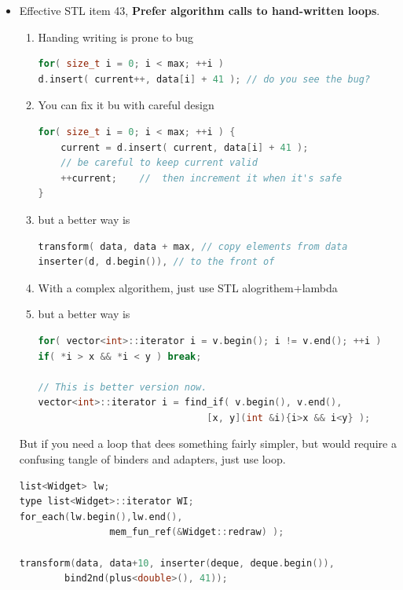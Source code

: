 \documentclass[a4paper,11pt,twoside]{book}
\begin{document}
\begin{itemize}

\item Effective STL item 43, \textbf{Prefer algorithm calls to hand-written loops}.
\begin{enumerate}
\item  Handing writing is prone to bug

\begin{lstlisting}[frame=single, language=c++]
for( size_t i = 0; i < max; ++i )
d.insert( current++, data[i] + 41 ); // do you see the bug?
\end{lstlisting}
\item You can fix it bu with careful design
\begin{lstlisting}[frame=single, language=c++]
for( size_t i = 0; i < max; ++i ) {
	current = d.insert( current, data[i] + 41 ); 
	// be careful to keep current valid
	++current;    //  then increment it when it's safe
}
\end{lstlisting}
\item but a better way is
\begin{lstlisting}[frame=single, language=c++]
transform( data, data + max, // copy elements from data
inserter(d, d.begin()), // to the front of
\end{lstlisting}

\item With a complex algorithem, just use STL alogrithem+lambda
\item but a better way is
\begin{lstlisting}[frame=single, language=c++]
for( vector<int>::iterator i = v.begin(); i != v.end(); ++i )
if( *i > x && *i < y ) break;

// This is better version now.
vector<int>::iterator i = find_if( v.begin(), v.end(),
                              [x, y](int &i){i>x && i<y} );
\end{lstlisting}



\end{enumerate}
But if you need a loop that dees something fairly simpler, but would require a confusing tangle of binders and adapters, just use loop.
\begin{lstlisting}[frame=single, language=c++]
list<Widget> lw;
type list<Widget>::iterator WI;
for_each(lw.begin(),lw.end(),
                mem_fun_ref(&Widget::redraw) );

transform(data, data+10, inserter(deque, deque.begin()),
        bind2nd(plus<double>(), 41));
\end{lstlisting}


\end{itemize}
\end{document}
